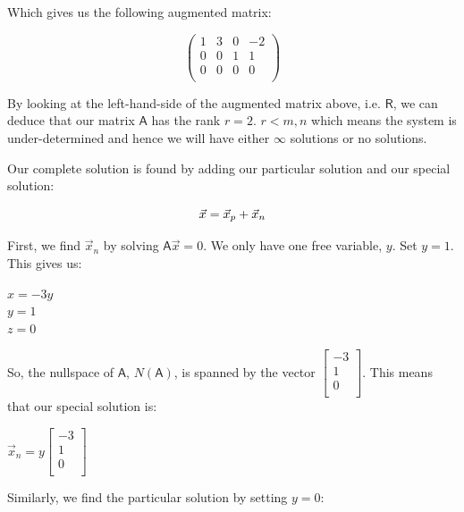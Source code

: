 \documentclass[a4paper, 11pt]{article}
\newcommand{\mat}[1]{\boldsymbol { \mathsf{#1}} }
\begin{document}
\begin{enumerate}
Which gives us the following augmented matrix:

\begin{equation*}
    \left(\begin{array}{ccc|c}  
    1 & 3 & 0 & -2 \\  
    0 & 0 & 1 & 1 \\
    0 & 0 & 0 & 0 \\
    \end{array}\right)
\end{equation*}

By looking at the left-hand-side of the augmented matrix above, i.e. $\mat{R}$, we can deduce that our matrix $\mat{A}$ has the rank $r = 2$. $r < m,n$ which means the system is under-determined and hence we will have either $\infty$ solutions or no solutions.

Our complete solution is found by adding our particular solution and our special solution:

\begin{equation}
    \vec x = \vec x_{p} + \vec x_{n} \\
\end{equation}

First, we find $\vec  x_{n}$ by solving $\mat{A}\vec x = 0$. We only have one free variable, $y$. Set $y = 1$. This gives us:

\begin{center}
    $x = -3y$ \\
    $y = 1$ \\
    $z = 0$ \\
\end{center}

So, the nullspace of $\mat{A}$, $N\mat{(A)}$, is spanned by the vector $\begin{bmatrix}
-3 \\
1 \\
0 \\
\end{bmatrix}$. This means that our special solution is:

\begin{center}
$\vec x_{n} = y\begin{bmatrix}
    -3 \\
    1 \\
    0 \\
\end{bmatrix}$
\end{center}

Similarly, we find the particular solution by setting $y = 0$:


\end{enumerate}
\end{document}
